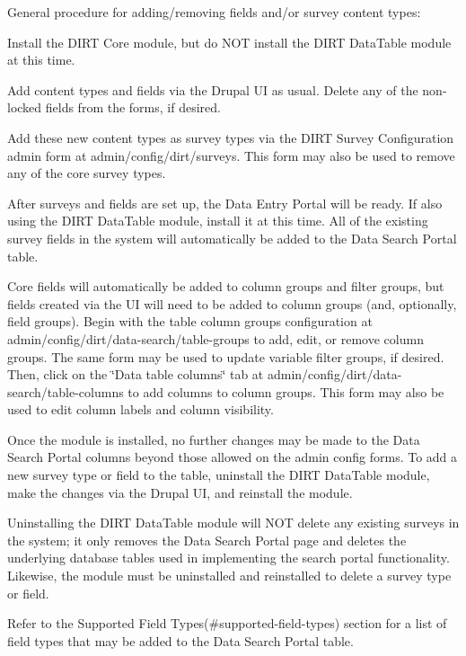 General procedure for adding/removing fields and/or survey content types\+:


\begin{DoxyEnumerate}
\item Install the D\+I\+RT Core module, but do N\+OT install the D\+I\+RT Data\+Table module at this time.
\item Add content types and fields via the Drupal UI as usual. Delete any of the non-\/locked fields from the forms, if desired.
\item Add these new content types as survey types via the D\+I\+RT Survey Configuration admin form at admin/config/dirt/surveys. This form may also be used to remove any of the core survey types.
\item After surveys and fields are set up, the Data Entry Portal will be ready. If also using the D\+I\+RT Data\+Table module, install it at this time. All of the existing survey fields in the system will automatically be added to the Data Search Portal table.
\item Core fields will automatically be added to column groups and filter groups, but fields created via the UI will need to be added to column groups (and, optionally, field groups). Begin with the table column groups configuration at admin/config/dirt/data-\/search/table-\/groups to add, edit, or remove column groups. The same form may be used to update variable filter groups, if desired. Then, click on the \char`\"{}\+Data table columns\char`\"{} tab at admin/config/dirt/data-\/search/table-\/columns to add columns to column groups. This form may also be used to edit column labels and column visibility.
\end{DoxyEnumerate}

Once the module is installed, no further changes may be made to the Data Search Portal columns beyond those allowed on the admin config forms. To add a new survey type or field to the table, uninstall the D\+I\+RT Data\+Table module, make the changes via the Drupal UI, and reinstall the module.

Uninstalling the D\+I\+RT Data\+Table module will N\+OT delete any existing surveys in the system; it only removes the Data Search Portal page and deletes the underlying database tables used in implementing the search portal functionality. Likewise, the module must be uninstalled and reinstalled to delete a survey type or field.

Refer to the Supported Field Types(\#supported-\/field-\/types) section for a list of field types that may be added to the Data Search Portal table.

